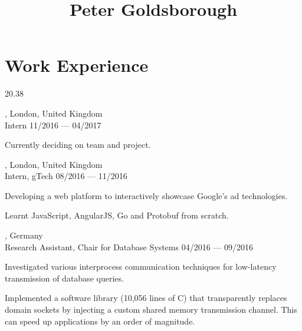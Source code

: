 




\begin{header}
	\title{Peter Goldsborough}
	\separate
	\separate
\end{header}

\section{Work Experience}{2}{0.38}

\begin{entry}
	{, London, United Kingdom}
	{\\Intern}
	{11/2016 --- 04/2017}
  \vspace{-1mm}
	\item Currently deciding on team and project.
\end{entry}

\begin{entry}
	{, London, United Kingdom}
	{\\Intern, gTech}
	{08/2016 --- 11/2016}
	\item Developing a web platform to interactively showcase Google's ad technologies.
  \item Learnt JavaScript, AngularJS, Go and Protobuf from scratch.
\end{entry}

\begin{entry}
	{, Germany}
	{\\Research Assistant, Chair for Database Systems}
	{04/2016 --- 09/2016}

  \item Investigated various interprocess communication techniques for low-latency transmission of database queries.
  \item Implemented a software library (10,056 lines of C) that transparently replaces domain sockets by injecting a custom shared memory transmission channel. This can speed up applications by an order of magnitude.
\end{entry}

